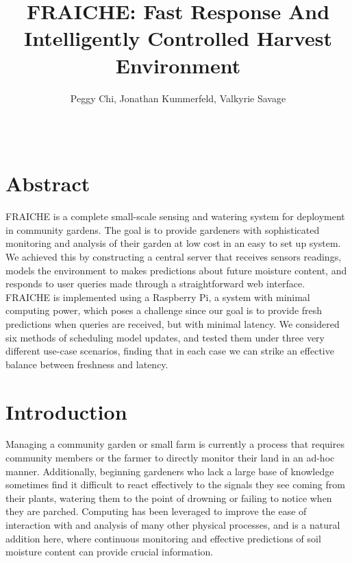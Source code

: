 \documentclass[a4paper]{acm_proc_article-sp}
\begin{document}

\title{FRAICHE: Fast Response And Intelligently Controlled Harvest Environment}
\author{\alignauthor Peggy Chi, Jonathan Kummerfeld, Valkyrie Savage \\
 \\
\\
} 
\maketitle

\setcounter{page}{1}

\section{Abstract}

FRAICHE is a complete small-scale sensing and watering system for deployment in community gardens.  The goal is to provide gardeners with sophisticated monitoring and analysis of their garden at low cost in an easy to set up system.  We achieved this by constructing a central server that receives sensors readings, models the environment to makes predictions about future moisture content, and responds to user queries made through a straightforward web interface.  FRAICHE is implemented using a Raspberry Pi, a system with minimal computing power, which poses a challenge since our goal is to provide fresh predictions when queries are received, but with minimal latency.  We considered six methods of scheduling model updates, and tested them under three very different use-case scenarios, finding that in each case we can strike an effective balance between freshness and latency.

\section{Introduction}

Managing a community garden or small farm is currently a process that requires community members or the farmer to directly monitor their land in an ad-hoc manner.  Additionally, beginning gardeners who lack a large base of knowledge sometimes find it difficult to react effectively to the signals they see coming from their plants, watering them to the point of drowning or failing to notice when they are parched.  Computing has been leveraged to improve the ease of interaction with and analysis of many other physical processes, and is a natural addition here, where continuous monitoring and effective predictions of soil moisture content can provide crucial information.
\end{document}

